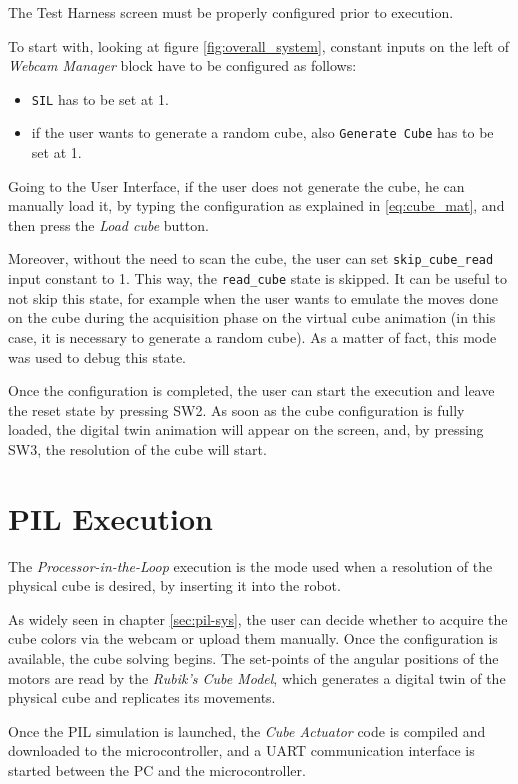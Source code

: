\documentclass{report}
\begin{document}
The Test Harness screen must be properly configured prior to execution.

To start with, looking at figure \ref{fig:overall_system}, constant inputs on the left of \textit{Webcam Manager} block have to be configured as follows:
\begin{itemize}
    \item \texttt{SIL} has to be set at 1.
    \item if the user wants to generate a random cube, also \texttt{Generate Cube} has to be set at 1.
\end{itemize}
Going to the User Interface, if the user does not generate the cube, he can manually load it, by typing the configuration as explained in \ref{eq:cube_mat}, and then press the \textit{Load cube} button.

Moreover, without the need to scan the cube, the user can set \texttt{skip\_cube\_read} input constant to 1. This way, the \texttt{read\_cube} state is skipped. It can be useful to not skip this state, for example when the user wants to emulate the moves done on the cube during the acquisition phase on the virtual cube animation (in this case, it is necessary to generate a random cube). As a matter of fact, this mode was used to debug this state.

Once the configuration is completed, the user can start the execution and leave the reset state by pressing SW2. As soon as the cube configuration is fully loaded, the digital twin animation will appear on the screen, and, by pressing SW3, the resolution of the cube will start.


\section{PIL Execution}\label{sec:pil}
The \textit{Processor-in-the-Loop} execution is the mode used when a resolution of the physical cube is desired, by inserting it into the robot.

As widely seen in chapter \ref{sec:pil-sys}, the user can decide whether to acquire the cube colors via the webcam or upload them manually. Once the configuration is available, the cube solving begins. The set-points of the angular positions of the motors are read by the \textit{Rubik's Cube Model}, which generates a digital twin of the physical cube and replicates its movements.

Once the PIL simulation is launched, the \textit{Cube Actuator} code is compiled and downloaded to the microcontroller, and a UART communication interface is started between the PC and the microcontroller.
\end{document}
